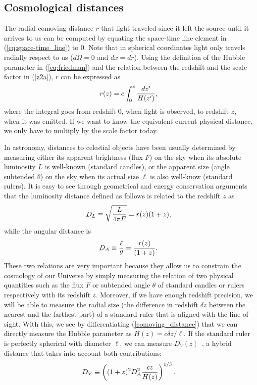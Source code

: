 \subsection{Cosmological distances}
\label{sec:distances}
The radial comoving distance $r$ that light traveled since it left the source until it arrives to us can be computed by equating the space-time line element in (\ref{eq:space-time_line}) to 0. Note that in spherical coordinates light only travels radially respect to us ($d\Omega = 0$ and $dx = dr$). Using the definition of the Hubble parameter in (\ref{eq:friedman}) and the relation between the redshift and the scale factor in (\ref{z2a}), $r$ can be expressed as 
\begin{equation}
r(z) = c \int_0^{z} {dz' \over H(z')},
\label{comoving_distance}
\end{equation}
where the integral goes from redshift 0, when light is observed, to redshift $z$, when it was emitted. If we want to know the equivalent current physical distance, we only have to multiply by the scale factor today.

In astronomy, distances to celestial objects have been usually determined by measuring either its apparent brightness (flux $F$) on the sky when its absolute luminosity $L$ is well-known (standard candles), or the apparent size (angle subtended $\theta$) on the sky when its actual size $\ell$ is also well-know (standard rulers). It is easy to see through geometrical and energy conservation arguments that the luminosity distance defined as follows is related to the redshift $z$ as
\begin{equation}
D_L \equiv \sqrt{L \over 4 \pi F}  = r(z) (1+z),
\label{eq:DL}
\end{equation}
while the angular distance is
\begin{equation}
D_A \equiv {\ell \over \theta} = {r(z) \over (1+z)}.
\label{eq:DA}
\end{equation}
These two relations are very important because they allow us to constrain the cosmology of our Universe by simply measuring the relation of two physical quantities such as the flux $F$ or subtended angle $\theta$ of standard candles or rulers respectively with its redshift $z$. Moreover, if we have enough redshift precision, we will be able to measure the radial size (the difference in redshift $\delta z$ between the nearest and the farthest part) of a standard ruler that is aligned with the line of sight. With this, we see by differentiating (\ref{comoving_distance}) that we can directly measure the Hubble parameter as $H(z) = c \delta z / \ell$. If the standard ruler is perfectly spherical with diameter $\ell$, we can measure $D_V(z)$~\citep{Eisenstein2005}, a hybrid distance that takes into account both contributions:
\begin{equation}
D_V \equiv \left((1+z)^2 D_A^2 {cz \over H(z)} \right)^{1/3}.
\label{eq:DV}
\end{equation}

